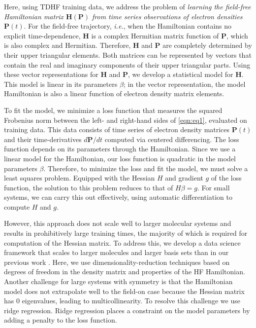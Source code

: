 \documentclass[10pt]{article}
\begin{document}
Here, using TDHF training data, we address the problem of \emph{learning the field-free Hamiltonian matrix $\mathbf{H}(\mathbf{P})$ from time series observations of electron densities $\mathbf{P}(t)$}. For the field-free trajectory, {\it i.e.}, when the Hamiltonian contains no explicit time-dependence, $\mathbf{H}$ is a complex Hermitian matrix function of $\mathbf{P}$, which is also complex and Hermitian. Therefore, $\mathbf{H}$ and $\mathbf{P}$ are completely determined by their upper triangular elements. Both matrices can be represented by vectors that contain the real and imaginary components of their upper triangular parts. Using these vector representations for $\mathbf{H}$ and $\mathbf{P}$, we develop a statistical model for $\mathbf{H}$. This model is linear in its parameters $\beta$; in the vector representation, the model Hamiltonian is also a linear function of electron density matrix elements.

To fit the model, we minimize a loss function that measures the squared Frobenius norm between the left- and right-hand sides of \eqref{eqn:eq1}, evaluated on training data. This data consists of time series of electron density matrices $\mathbf{P}(t)$ and their time-derivatives $d \mathbf{P} / dt$ computed via centered differencing.  The loss function depends on its parameters through the Hamiltonian. Since we use a linear model for the Hamiltonian, our loss function is quadratic in the model parameters $\beta$. Therefore, to minimize the loss and fit the model, we must solve a least squares problem.  Equipped with the Hessian $H$ and gradient $g$ of the loss function, the solution to this problem reduces to that of $H\beta = g$.  For small systems, we can carry this out effectively, using automatic differentiation to compute $H$ and $g$.

However, this approach does not scale well to larger molecular systems and results in prohibitively large training times, the majority of which is required for computation of the Hessian matrix. To address this, we develop a data science framework that scales to larger molecules and larger basis sets than in our previous work \cite{bhat2020machine}. Here, we use dimensionality-reduction techniques based on degrees of freedom in the density matrix and properties of the HF Hamiltonian. Another challenge for large systems with symmetry is that the Hamiltonian model does not extrapolate well to the field-on case because the Hessian matrix has $0$ eigenvalues, leading to multicollinearity. To resolve this challenge we use ridge regression. Ridge regression places a constraint on the model parameters by adding a penalty to the loss function. 
\end{document}
